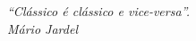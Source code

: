 

	\begin{flushright}
		\textit{``Clássico é clássico e vice-versa''.\\
		Mário Jardel}
	\end{flushright}


%
%
%

